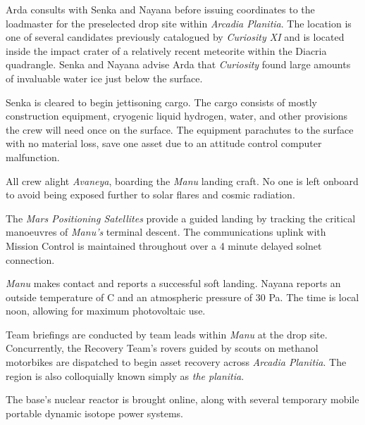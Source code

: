 

Arda consults with Senka and Nayana before issuing coordinates to the loadmaster for the preselected drop site within {\it Arcadia Planitia}. The location is one of several candidates previously catalogued by {\it Curiosity XI} and is located inside the impact crater of a relatively recent meteorite within the Diacria quadrangle. Senka and Nayana advise Arda that {\it Curiosity} found large amounts of invaluable water ice just below the surface. 

Senka is cleared to begin jettisoning cargo. The cargo consists of mostly construction equipment, cryogenic liquid hydrogen, water, and other provisions the crew will need once on the surface. The equipment parachutes to the surface with no material loss, save one asset due to an attitude control computer malfunction.
\StopTimelineDate

All crew alight {\it Avaneya}, boarding the {\it Manu} landing craft. No one is left onboard to avoid being exposed further to solar flares and cosmic radiation.

The {\it Mars Positioning Satellites} provide a guided landing by tracking the critical manoeuvres of {\it Manu's} terminal descent. The communications uplink with Mission Control is maintained throughout over a 4 minute delayed solnet connection.

{\it Manu} makes contact and reports a successful soft landing. Nayana reports an outside temperature of C and an atmospheric pressure of 30 Pa. The time is local noon, allowing for maximum photovoltaic use.

Team briefings are conducted by team leads within {\it Manu} at the drop site. Concurrently, the Recovery Team's rovers guided by scouts on methanol motorbikes are dispatched to begin asset recovery across {\it Arcadia Planitia}. The region is also colloquially known simply as {\it the planitia}.

The base's nuclear reactor is brought online, along with several temporary mobile portable dynamic isotope power systems.

